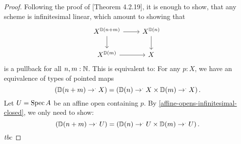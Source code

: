 \begin{proof}
  Following the proof of \cite{david-orbifolds}[Theorem 4.2.19],
  it is enough to show, that any scheme is infinitesimal linear,
  which amount to showing that
  \[
    \begin{tikzcd}
      X^{\D(n+m)}\ar[r]\ar[d] & X^{\D(n)}\ar[d] \\
      X^{\D(m)}\ar[r]         & X
    \end{tikzcd}
  \]
  is a pullback for all $n,m:\mathbb{N}$.
  This is equivalent to:
  For any $p:X$, we have an equivalence of types of pointed maps
  \[ \left({\D(n+m)}\to^.X\right) = \left({\D(n)}\to^.X \times {\D(m)}\to^.X\right)\rlap{.} \]
  Let $U=\operatorname{Spec} A$ be an affine open containing $p$.
  By \cref{affine-opens-infinitesimal-closed},
  we only need to show:
  \[ \left({\D(n+m)}\to^.U\right) = \left({\D(n)}\to^.U \times {\D(m)}\to^.U\right)\rlap{.} \]
  \emph{tbc}
\end{proof}